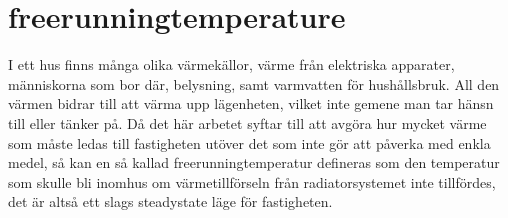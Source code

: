 \section*{freerunningtemperature}
I ett hus finns många olika värmekällor, värme från elektriska apparater, människorna som bor där, belysning, samt varmvatten för hushållsbruk. All den värmen bidrar till att värma upp lägenheten, vilket inte gemene man tar hänsn till eller tänker på. Då det här arbetet syftar till att avgöra hur mycket värme som måste ledas till fastigheten utöver det som inte gör att påverka med enkla medel, så kan en så kallad freerunningtemperatur defineras som den temperatur som skulle bli inomhus om värmetillförseln från radiatorsystemet inte tillfördes, det är altså ett slags steadystate läge för fastigheten.

\newpage
